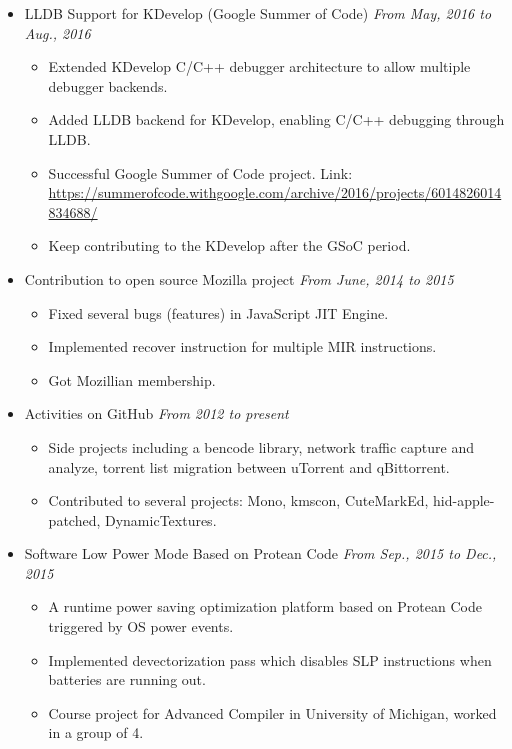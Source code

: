 \documentclass[letterpaper,11pt]{article}
\newenvironment{extra}{}{}
\begin{document}
\begin{itemize}
    \item LLDB Support for KDevelop (Google Summer of Code) \hfill \textit{From May, 2016 to Aug., 2016}
    \begin{itemize}
        \item Extended KDevelop C/C++ debugger architecture to allow multiple debugger backends.
        \item Added LLDB backend for KDevelop, enabling C/C++ debugging through LLDB.
        \item Successful Google Summer of Code project. Link:
\url{https://summerofcode.withgoogle.com/archive/2016/projects/6014826014834688/}
        \item Keep contributing to the KDevelop after the GSoC period.
    \end{itemize}

\begin{extra}
    \item Contribution to open source Mozilla project \hfill \textit{From June, 2014 to 2015}
    \begin{itemize}
        \item Fixed several bugs (features) in JavaScript JIT Engine.
        \item Implemented recover instruction for multiple MIR instructions.
        \item Got Mozillian membership.
    \end{itemize}
\end{extra}

\begin{extra}
    \item Activities on GitHub \hfill \textit{From 2012 to present}
    \begin{itemize}
        \item Side projects including a bencode library, network traffic capture and analyze, torrent list
migration between uTorrent and qBittorrent.
        \item Contributed to several projects: Mono, kmscon, CuteMarkEd, hid-apple-patched, DynamicTextures.
    \end{itemize}
\end{extra}

    \item Software Low Power Mode Based on Protean Code \hfill \textit{From Sep., 2015 to Dec., 2015}
    \begin{itemize}
        \item A runtime power saving optimization platform based on Protean Code triggered by OS power events.
        \item Implemented devectorization pass which disables SLP instructions when batteries are running out.
        \item Course project for Advanced Compiler in University of Michigan, worked in a group of 4.
    \end{itemize}


\end{itemize}
\end{document}

